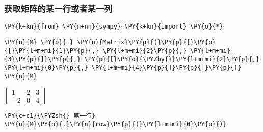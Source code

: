     \hypertarget{ux83b7ux53d6ux77e9ux9635ux7684ux67d0ux4e00ux884cux6216ux8005ux67d0ux4e00ux5217}{%
\subsubsection{获取矩阵的某一行或者某一列}\label{ux83b7ux53d6ux77e9ux9635ux7684ux67d0ux4e00ux884cux6216ux8005ux67d0ux4e00ux5217}}

    \begin{tcolorbox}[breakable, size=fbox, boxrule=1pt, pad at break*=1mm,colback=cellbackground, colframe=cellborder]
\begin{Verbatim}[commandchars=\\\{\}]
\PY{k+kn}{from} \PY{n+nn}{sympy} \PY{k+kn}{import} \PY{o}{*}
\end{Verbatim}
\end{tcolorbox}

    \begin{tcolorbox}[breakable, size=fbox, boxrule=1pt, pad at break*=1mm,colback=cellbackground, colframe=cellborder]
\begin{Verbatim}[commandchars=\\\{\}]
\PY{n}{M} \PY{o}{=} \PY{n}{Matrix}\PY{p}{(}\PY{p}{[}\PY{p}{[}\PY{l+m+mi}{1}\PY{p}{,} \PY{l+m+mi}{2}\PY{p}{,} \PY{l+m+mi}{3}\PY{p}{]}\PY{p}{,} \PY{p}{[}\PY{o}{\PYZhy{}}\PY{l+m+mi}{2}\PY{p}{,} \PY{l+m+mi}{0}\PY{p}{,} \PY{l+m+mi}{4}\PY{p}{]}\PY{p}{]}\PY{p}{)}
\PY{n}{M}
\end{Verbatim}
\end{tcolorbox}
 
            
    
    $\displaystyle \left[\begin{matrix}1 & 2 & 3\\-2 & 0 & 4\end{matrix}\right]$

    

    \begin{tcolorbox}[breakable, size=fbox, boxrule=1pt, pad at break*=1mm,colback=cellbackground, colframe=cellborder]
\begin{Verbatim}[commandchars=\\\{\}]
\PY{c+c1}{\PYZsh{} 第一行}
\PY{n}{M}\PY{o}{.}\PY{n}{row}\PY{p}{(}\PY{l+m+mi}{0}\PY{p}{)}
\end{Verbatim}
\end{tcolorbox}
 

